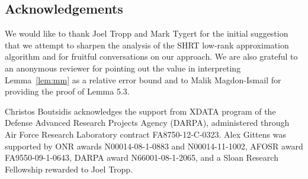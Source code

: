 %
%
%

\subsection*{Acknowledgements}

We would like to thank Joel Tropp and Mark Tygert for the initial suggestion that we attempt
to sharpen the analysis of the SHRT low-rank approximation algorithm and for fruitful conversations
on our approach. We are also grateful to an anonymous reviewer for pointing out the value in interpreting Lemma~\ref{lem:mm} as a relative error bound
and to Malik Magdon-Ismail for providing the proof of Lemma 5.3.

Christos Boutsidis acknowledges the support from XDATA program of the Defense Advanced Research Projects Agency (DARPA), administered through Air Force Research Laboratory contract FA8750-12-C-0323. Alex Gittens was supported by ONR awards N00014-08-1-0883 and N00014-11-1002, AFOSR award FA9550-09-1-0643, DARPA award N66001-08-1-2065, and a Sloan Research Fellowship rewarded to Joel Tropp.

